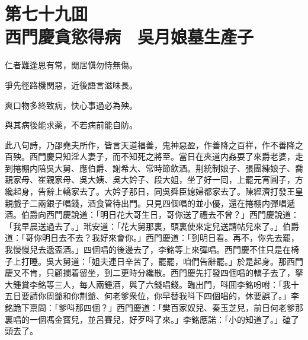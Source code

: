 
\chapter*{第七十九囬　\\西門慶貪慾得病　吳月娘墓生產子}


\begin{myquote}
仁者難逢思有常，閒居愼勿恃無傷。

爭先徑路機関惡，近後語言滋味長。

爽口物多終致病，快心事過必為殃。

與其病後能求薬，不若病前能自防。
\end{myquote}

此八句詩，乃邵堯夫所作，皆言天道福善，鬼神惡盈，作善降之百祥，作不善降之百殃。西門慶只知淫人妻子，而不知死之將至。當日在夾道内姦耍了來爵老婆，走到捲棚内陪吳大舅、應伯爵、謝希大、常時節飲酒。荆統制娘子、張團練娘子、喬親家母、崔親家母、吳大姨、吳大妗子、段大姐，坐了好一囘，上罷元宵圓子，方纔起身，告辭上轎家去了。大妗子那日，同吳舜臣媳婦都家去了。陳經濟打發王皇親戲子二兩銀子唱錢，酒食管待出門。只見四個唱的並小優，還在捲棚内彈唱遞酒。伯爵向西門慶說道：「明日花大哥生日，哥你送了禮去不曾？」西門慶說道：「我早晨送過去了。」玳安道：「花大舅那裏，頭裏使來定兒送請帖兒來了。」伯爵道：「哥你明日去不去？我好來會你。」西門慶道：「到明日看。再不，你先去罷，我慢慢兒去遞盃酒。」四個唱的後邊去了，李銘等上來彈唱。西門慶不住只是在椅子上打睡。吳大舅道：「姐夫連日辛苦了，罷罷，咱們告辭罷。」於是起身。那西門慶又不肯，只顧攔着留坐，到二更時分纔散。西門慶先打發四個唱的轎子去了，拏大鍾賞李銘等三人，每人兩鍾酒，與了六錢唱錢。臨出門，呌囬李銘吩咐：「我十五日要請你周爺和你荆爺、何老爹衆位，你早替我呌下四個唱的，休要誤了。」李銘跪下禀問：「爹呌那四個？」西門慶道：「樊百家奴兒、秦玉芝兒，前日何老爹那裏唱的一個馮金寳兒，並呂賽兒，好歹呌了來。」李銘應諾：「小的知道了。」磕了頭去了。

